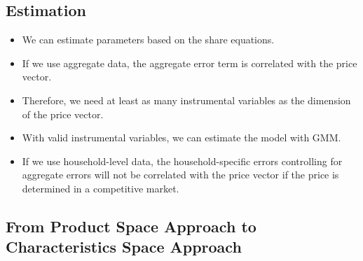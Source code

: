 \documentclass[
]{book}
\providecommand{\tightlist}{%
  \setlength{\itemsep}{0pt}\setlength{\parskip}{0pt}}
\begin{document}
\hypertarget{estimation}{%
\subsection{Estimation}\label{estimation}}

\begin{itemize}
\tightlist
\item
  We can estimate parameters based on the share equations.
\item
  If we use aggregate data, the aggregate error term is correlated with the price vector.
\item
  Therefore, we need at least as many instrumental variables as the dimension of the price vector.
\item
  With valid instrumental variables, we can estimate the model with GMM.
\item
  If we use household-level data, the household-specific errors controlling for aggregate errors will not be correlated with the price vector if the price is determined in a competitive market.
\end{itemize}

\hypertarget{from-product-space-approach-to-characteristics-space-approach}{%
\subsection{From Product Space Approach to Characteristics Space Approach}\label{from-product-space-approach-to-characteristics-space-approach}}
\end{document}
